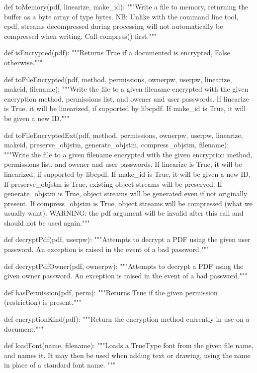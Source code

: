 def toMemory(pdf, linearize, make_id):
    """Write a file to memory, returning the buffer as a byte array of type
    bytes. NB: Unlike with the command line tool, cpdf, streams decompressed
    during processing will not automatically be compressed when writing. Call
    compress() first."""

def isEncrypted(pdf):
    """Returns True if a documented is encrypted, False otherwise."""

def toFileEncrypted(pdf, method, permissions, ownerpw, userpw, linearize,
                    makeid, filename):
    """Write the file to a given filename encrypted with the given encryption
    method, permissions list, and owener and user passwords. If linearize is
    True, it will be linearized, if supported by libcpdf. If make_id is True,
    it will be given a new ID."""

def toFileEncryptedExt(pdf, method, permissions, ownerpw, userpw, linearize,
                       makeid, preserve_objstm, generate_objstm,
                       compress_objstm, filename):
    """Write the file to a given filename encrypted with the given encryption
    method, permissions list, and owener and user passwords. If linearize is
    True, it will be linearized, if supported by libcpdf. If make_id is True,
    it will be given a new ID. If preserve_objstm is True, existing object
    streams will be preserved. If generate_objstm is True, object streams will
    be generated even if not originally present. If compress_objstm is True,
    object streams will be compressed (what we usually want). WARNING: the pdf
    argument will be invalid after this call and should not be used again."""

def decryptPdf(pdf, userpw):
    """Attempts to decrypt a PDF using the given user password. An exception is
    raised in the event of a bad password."""

def decryptPdfOwner(pdf, ownerpw):
    """Attempts to decrypt a PDF using the given owner password. An exception
    is raised in the event of a bad password."""

def hasPermission(pdf, perm):
    """Returns True if the given permission (restriction) is present."""

def encryptionKind(pdf):
    """Return the encryption method currently in use on a document."""

def loadFont(name, filename):
    """Loads a TrueType font from the given file name, and names it. It may
    then be used when adding text or drawing, using the name in place of a
    standard font name. """
